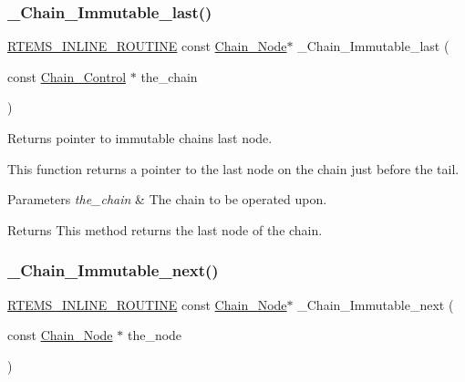 \subsubsection{\texorpdfstring{\_Chain\_Immutable\_last()}{\_Chain\_Immutable\_last()}}
{\footnotesize\ttfamily \mbox{\hyperlink{group__RTEMSScoreBaseDefs_gac216239df231d5dbd15e3520b0b9313f}{R\+T\+E\+M\+S\+\_\+\+I\+N\+L\+I\+N\+E\+\_\+\+R\+O\+U\+T\+I\+NE}} const \mbox{\hyperlink{group__RTEMSScoreChain_ga0dd4bfcca1ac7f90de2842e447846d3d}{Chain\+\_\+\+Node}}$\ast$ \+\_\+\+Chain\+\_\+\+Immutable\+\_\+last (\begin{DoxyParamCaption}\item[{const \mbox{\hyperlink{unionChain__Control}{Chain\+\_\+\+Control}} $\ast$}]{the\+\_\+chain }\end{DoxyParamCaption})}



Returns pointer to immutable chain\textquotesingle{}s last node. 

This function returns a pointer to the last node on the chain just before the tail.


\begin{DoxyParams}{Parameters}
{\em the\+\_\+chain} & The chain to be operated upon.\\
\hline
\end{DoxyParams}
\begin{DoxyReturn}{Returns}
This method returns the last node of the chain. 
\end{DoxyReturn}
\mbox{\label{group__RTEMSScoreChain_gaf1838bc5651d4d6de6bc380c40a8300e}} 
\subsubsection{\texorpdfstring{\_Chain\_Immutable\_next()}{\_Chain\_Immutable\_next()}}
{\footnotesize\ttfamily \mbox{\hyperlink{group__RTEMSScoreBaseDefs_gac216239df231d5dbd15e3520b0b9313f}{R\+T\+E\+M\+S\+\_\+\+I\+N\+L\+I\+N\+E\+\_\+\+R\+O\+U\+T\+I\+NE}} const \mbox{\hyperlink{group__RTEMSScoreChain_ga0dd4bfcca1ac7f90de2842e447846d3d}{Chain\+\_\+\+Node}}$\ast$ \+\_\+\+Chain\+\_\+\+Immutable\+\_\+next (\begin{DoxyParamCaption}\item[{const \mbox{\hyperlink{group__RTEMSScoreChain_ga0dd4bfcca1ac7f90de2842e447846d3d}{Chain\+\_\+\+Node}} $\ast$}]{the\+\_\+node }\end{DoxyParamCaption})}



